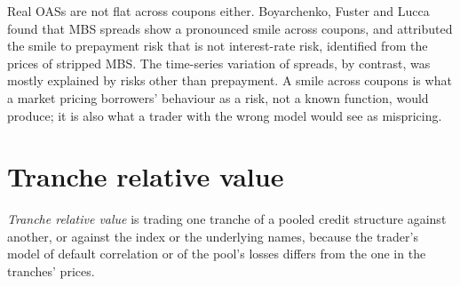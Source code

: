 \begin{omfigure}

\label{fig:s2:mortgage-and-structured-credit-strategies:oas}
\end{omfigure}

Real OASs are not flat across coupons either. Boyarchenko, Fuster and Lucca found that MBS spreads show a pronounced smile across coupons, and
attributed the smile to prepayment risk that is not interest-rate risk, identified from the prices of stripped MBS. The time-series variation of
spreads, by contrast, was mostly explained by risks other than prepayment. A smile across coupons is what a market pricing borrowers' behaviour as a
risk, not a known function, would produce; it is also what a trader with the wrong model would see as mispricing.

\section{Tranche relative value}

\begin{definition}\label{def:s2:mortgage-and-structured-credit-strategies:tranchrv}
\emph{Tranche relative value} is trading one tranche of a pooled credit structure against another, or against the
index or the underlying names, because the trader's model of default correlation or of the pool's losses differs from the one in the tranches'
prices.
\end{definition}


